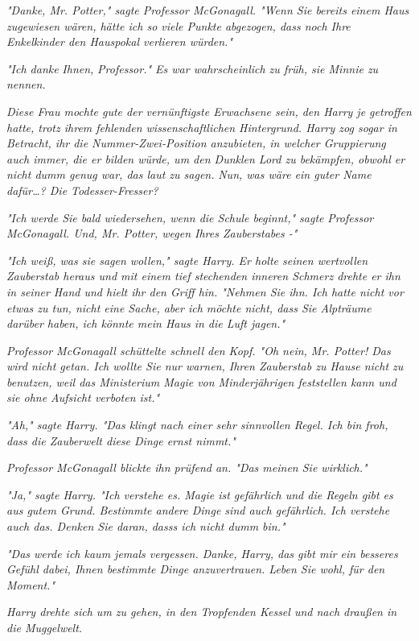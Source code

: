 {\emph{"Danke, Mr. Potter," sagte Professor McGonagall. "Wenn Sie bereits einem Haus zugewiesen wären, hätte ich so viele Punkte abgezogen, dass noch Ihre Enkelkinder den Hauspokal verlieren würden."}

\emph{"Ich danke} \emph{\emph{Ihnen,}} \emph{Professor." Es war wahrscheinlich zu früh, sie Minnie zu nennen.}

\emph{Diese Frau mochte gute der vernünftigste Erwachsene sein, den Harry je getroffen hatte, trotz ihrem fehlenden wissenschaftlichen Hintergrund. Harry zog sogar in Betracht, ihr die Nummer-Zwei-Position anzubieten, in welcher Gruppierung auch immer, die er bilden würde, um den Dunklen Lord zu bekämpfen, obwohl er nicht dumm genug war, das laut zu sagen.} \emph{\emph{Nun, was wäre ein guter Name dafür…? Die Todesser-Fresser?}}

\emph{"Ich werde Sie bald wiedersehen, wenn die Schule beginnt," sagte} \emph{Professor McGonagall. Und, Mr. Potter, wegen Ihres Zauberstabes -"}

\emph{"Ich weiß, was sie sagen wollen," sagte Harry. Er holte seinen wertvollen Zauberstab heraus und mit einem tief stechenden inneren Schmerz drehte er ihn in seiner Hand und hielt ihr den Griff hin. "Nehmen Sie ihn. Ich hatte nicht vor etwas zu tun, nicht eine Sache, aber ich möchte nicht, dass Sie Alpträume darüber haben, ich könnte mein Haus in die Luft jagen."}

\emph{Professor McGonagall schüttelte schnell den Kopf. "Oh nein, Mr. Potter! Das wird nicht getan. Ich wollte Sie nur warnen, Ihren Zauberstab zu Hause nicht zu benutzen, weil das Ministerium Magie von Minderjährigen feststellen kann und sie ohne Aufsicht verboten ist."}

\emph{"Ah," sagte Harry. "Das klingt nach einer sehr sinnvollen Regel. Ich bin froh, dass die Zauberwelt diese Dinge ernst nimmt."}

\emph{Professor McGonagall blickte ihn prüfend an. "Das meinen Sie wirklich."}

\emph{"Ja," sagte Harry. "Ich verstehe es. Magie ist gefährlich und die Regeln gibt es aus gutem Grund. Bestimmte andere Dinge sind auch gefährlich. Ich verstehe auch das. Denken Sie daran, dasss ich nicht dumm bin."}

\emph{"Das werde ich kaum jemals vergessen. Danke, Harry, das gibt mir ein besseres Gefühl dabei, Ihnen bestimmte Dinge anzuvertrauen. Leben Sie wohl, für den Moment."}

\emph{Harry drehte sich um zu gehen, in den Tropfenden Kessel und nach draußen in die Muggelwelt.}

}
